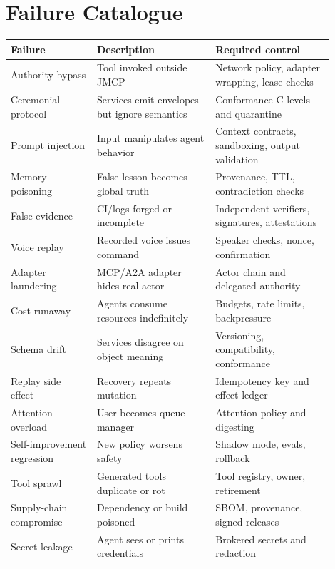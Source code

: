 \documentclass[10pt,journal,onecolumn]{IEEEtran}
\begin{document}
\section{Failure Catalogue}
\begin{longtable}{p{0.24\linewidth}p{0.33\linewidth}p{0.33\linewidth}}
\toprule
Failure & Description & Required control\\
\midrule
Authority bypass & Tool invoked outside JMCP & Network policy, adapter wrapping, lease checks\\
Ceremonial protocol & Services emit envelopes but ignore semantics & Conformance C-levels and quarantine\\
Prompt injection & Input manipulates agent behavior & Context contracts, sandboxing, output validation\\
Memory poisoning & False lesson becomes global truth & Provenance, TTL, contradiction checks\\
False evidence & CI/logs forged or incomplete & Independent verifiers, signatures, attestations\\
Voice replay & Recorded voice issues command & Speaker checks, nonce, confirmation\\
Adapter laundering & MCP/A2A adapter hides real actor & Actor chain and delegated authority\\
Cost runaway & Agents consume resources indefinitely & Budgets, rate limits, backpressure\\
Schema drift & Services disagree on object meaning & Versioning, compatibility, conformance\\
Replay side effect & Recovery repeats mutation & Idempotency key and effect ledger\\
Attention overload & User becomes queue manager & Attention policy and digesting\\
Self-improvement regression & New policy worsens safety & Shadow mode, evals, rollback\\
Tool sprawl & Generated tools duplicate or rot & Tool registry, owner, retirement\\
Supply-chain compromise & Dependency or build poisoned & SBOM, provenance, signed releases\\
Secret leakage & Agent sees or prints credentials & Brokered secrets and redaction\\
\bottomrule
\end{longtable}
\end{document}
